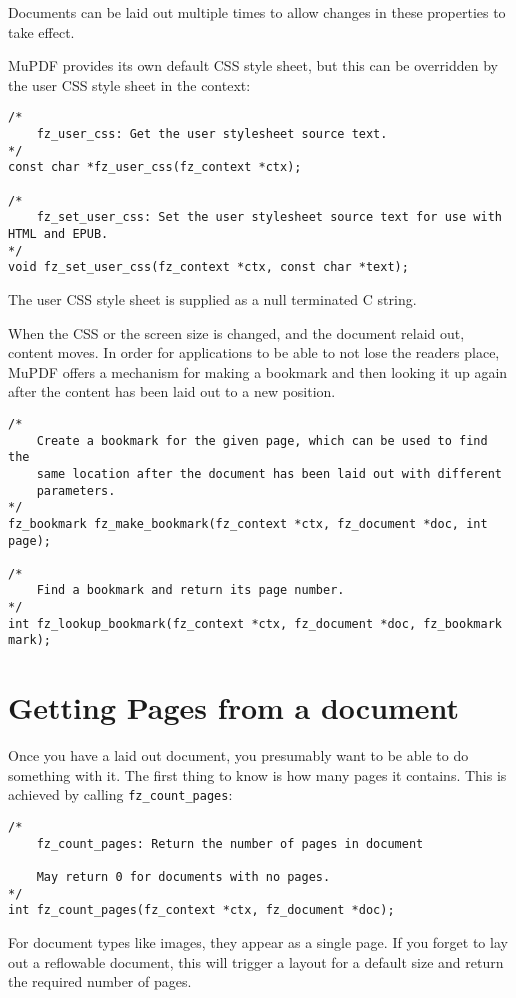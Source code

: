 \documentclass[oneside]{book}
\begin{document}
Documents can be laid out multiple times to allow changes in these properties to take effect.

MuPDF provides its own default CSS style sheet, but this can be overridden by the user CSS style sheet in the context:

\begin{lstlisting}
/*
	fz_user_css: Get the user stylesheet source text.
*/
const char *fz_user_css(fz_context *ctx);

/*
	fz_set_user_css: Set the user stylesheet source text for use with HTML and EPUB.
*/
void fz_set_user_css(fz_context *ctx, const char *text);
\end{lstlisting}

The user CSS style sheet is supplied as a null terminated C string.

When the CSS or the screen size is changed, and the document relaid out, content moves. In order for applications to be able to not lose the readers place, MuPDF offers a mechanism for making a bookmark and then looking it up again after the content has been laid out to a new position.

\begin{lstlisting}
/*
	Create a bookmark for the given page, which can be used to find the
	same location after the document has been laid out with different
	parameters.
*/
fz_bookmark fz_make_bookmark(fz_context *ctx, fz_document *doc, int page);

/*
	Find a bookmark and return its page number.
*/
int fz_lookup_bookmark(fz_context *ctx, fz_document *doc, fz_bookmark mark);
\end{lstlisting}

\section{Getting Pages from a document}


Once you have a laid out document, you presumably want to be able to do something with it. The first thing to know is how many pages it contains. This is achieved by calling \texttt{fz\_count\_pages}:

\begin{lstlisting}
/*
	fz_count_pages: Return the number of pages in document

	May return 0 for documents with no pages.
*/
int fz_count_pages(fz_context *ctx, fz_document *doc);
\end{lstlisting}


For document types like images, they appear as a single page. If you forget to lay out a reflowable document, this will trigger a layout for a default size and return the required number of pages.
\end{document}
